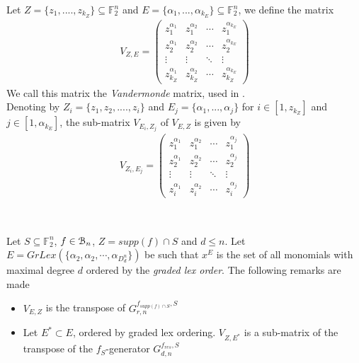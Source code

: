 \documentclass[11pt]{llncs}
\begin{document}
\begin{definition}\label{def:tVandermonde}
    Let $Z = \{z_1, ...., z_{k_Z}\} \subseteq \mathbb{F}_2^n$ and $E = \{\alpha_1, ..., \alpha_{k_E}\}\subseteq \mathbb{F}_2^n$, we define the matrix
    \begin{align*}
        V_{Z,E} = 
        \begin{pmatrix}
            z_1^{\alpha_1} & z_1^{\alpha_2} & \cdots & z_1^{\alpha_{k_E}} \\
            z_2^{\alpha_1} & z_2^{\alpha_2} & \cdots & z_2^{\alpha_{k_E}} \\
            \vdots & \vdots & \ddots & \vdots \\
            z_{k_{Z}}^{\alpha_1} & z_{k_Z}^{\alpha_2} & \cdots & z_{k_Z}^{\alpha_{k_E}}
        \end{pmatrix}
    \end{align*}
    We call this matrix the \textit{Vandermonde} matrix, used in \cite{armknecht2006efficient}.\\
    Denoting by $Z_i = \{z_1, z_2, ...., z_i\}$ and $E_j = \{\alpha_1, ..., \alpha_j\}$ for $i\in[1,z_{k_Z}]$ and $j\in[1,\alpha_{k_E}]$, the sub-matrix $V_{E_i, Z_j}$ of $V_{E,Z}$ is given by
    \begin{align*}
        V_{Z_i, E_j} = 
        \begin{pmatrix}
            z_1^{\alpha_1} & z_1^{\alpha_2} & \cdots & z_1^{\alpha_{j}} \\
            z_2^{\alpha_1} & z_2^{\alpha_2} & \cdots & z_2^{\alpha_{j}} \\
            \vdots & \vdots & \ddots & \vdots \\
            z_{i}^{\alpha_1} & z_{i}^{\alpha_2} & \cdots & z_{i}^{\alpha_j}
        \end{pmatrix}
    \end{align*}
\end{definition}

\\
\begin{remark}\label{rem:subsetOfReedMuller}
    Let $S\subseteq \mathbb{F}_2^n$, $f \in \mathcal{B}_{n}$, $Z = supp(f) \cap S$ and $d \leq n$. Let $E = GrLex(\{\alpha_2, \alpha_2, \cdots, \alpha_{D_d^n}\})$ be such that $x^E$ is the set of all monomials with maximal degree $d$ ordered by the \textit{graded lex order}. The following remarks are made
    \begin{itemize}
        \item $V_{E,Z}$ is the transpose of $G_{r,n}^{f_{supp\left(f\right) \cap S},S}$
        \item Let $E^{*}\subset E$, ordered by graded lex ordering. $V_{Z,E^{*}}$ is a sub-matrix of the transpose of the $f_S$-generator $G_{d,n}^{f_{res}, S}$
    \end{itemize}
\end{remark}
\end{document}
